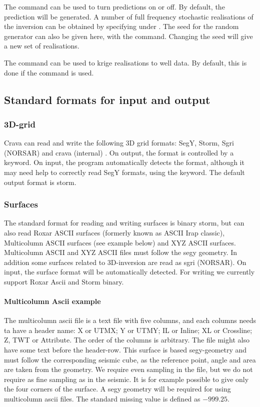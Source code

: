 The command  can be used to turn
predictions on or off. By default, the prediction will be generated. A
number of full frequency stochastic realisations of the inversion can
be obtained by specifying  under . The seed for the random generator can also be given here, with the  command. Changing the seed will give a new set of realisations.

The command  can be
used to krige realisations to well data. By default, this is done if
the  command is used. 

\subsection{Standard formats for input and output}
\label{sec:gridformats}

\subsubsection{3D-grid}
Crava can read and write the following 3D grid
  formats: SegY, Storm, Sgri (NORSAR) and crava (internal) . On
  output, the format is controlled by a  keyword. On input,
  the program automatically detects the format, although it may need
  help to correctly read SegY formats, using the 
  keyword. The default output format is storm.

\subsubsection{Surfaces}
The standard format for reading and writing
  surfaces is binary storm, but \crava can also read Roxar ASCII
  surfaces (formerly known as ASCII Irap classic), Multicolumn ASCII
  surfaces (see example below) and XYZ ASCII surfaces. Multicolumn ASCII and XYZ ASCII files must follow the segy geometry.
   In addition some surfaces related to 3D-inversion are read as sgri (NORSAR). On input,
  the surface format will be automatically detected. For writing we currently support Roxar Ascii and Storm binary.
  
\paragraph{Multicolumn Ascii example}
The multicolumn ascii file is a text file with five columns, and each columns needs ta have a header name:
X or UTMX; Y or UTMY; IL or Inline; XL or Crossline; Z, TWT or Attribute. The order of the columns is arbitrary. The file might also have some text before the header-row. This surface is based segy-geometry and must follow the corresponding seismic cube, as the reference point, angle and area are taken from the geometry. We require even sampling in the file, but we do not require as fine sampling as in the seismic. It is for example possible to give only the four corners of the surface. A segy geometry will be required for using multicolumn ascii files. The standard missing value is defined as $-999.25$.

